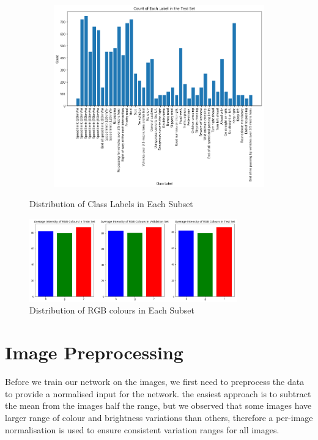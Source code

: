 \documentclass[]{article}
\begin{document}
\begin{figure}[p]
\begin{subfigure}{0.5\textwidth}
		\centering
		\includegraphics[width=\textwidth]{balance3}
	\end{subfigure}
	\caption{Distribution of Class Labels in Each Subset}
	\label{fig:comp}
	
\end{figure}

\begin{figure}[p]
	\centering
	\includegraphics[width=0.8\textwidth]{cd}
	\caption{Distribution of RGB colours in Each Subset}
	\label{fig:colour}
\end{figure}

\section{Image Preprocessing}
Before we train our network on the images, we first need to preprocess the data to provide a normalised input for the network. the easiest approach is to subtract the mean from the images half the range, but we observed that some images have larger range of colour and brightness variations than others, therefore a per-image normalisation is used to ensure consistent variation ranges for all images.
\end{document}
